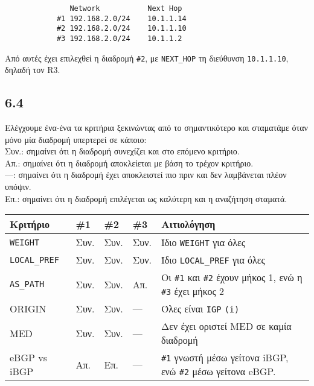 \documentclass[a4paper, 12pt]{article}
\begin{document}
		\begin{verbatim}
			   Network           Next Hop
			#1 192.168.2.0/24    10.1.1.14
			#2 192.168.2.0/24    10.1.1.10
			#3 192.168.2.0/24    10.1.1.2
		\end{verbatim}
		
		Από αυτές έχει επιλεχθεί η διαδρομή \verb|#2|, με \verb|NEXT_HOP| τη διεύθυνση \verb|10.1.1.10|, δηλαδή τον R3.

	\subsection*{6.4}
		Ελέγχουμε ένα-ένα τα κριτήρια ξεκινώντας από το σημαντικότερο και σταματάμε όταν μόνο μία διαδρομή υπερτερεί σε κάποιο: \\
		
		Συν.: σημαίνει ότι η διαδρομή συνεχίζει και στο επόμενο κριτήριο. \\
		Απ.: σημαίνει ότι η διαδρομή αποκλείεται με βάση το τρέχον κριτήριο. \\
		---: σημαίνει ότι η διαδρομή έχει αποκλειστεί πιο πριν και δεν λαμβάνεται πλέον υπόψιν. \\
		Επ.: σημαίνει ότι η διαδρομή επιλέγεται ως καλύτερη και η αναζήτηση σταματά. \\
		
		\begin{tabular}{|l|l|l|l|l|}
			\hline
			\textbf{Κριτήριο} & \textbf{\#1} & \textbf{\#2} & \textbf{\#3} & \textbf{Αιτιολόγηση}                                     \\ 
			\hline
			\verb|WEIGHT|     & Συν.         & Συν.         & Συν.         & Ίδιο \verb|WEIGHT| για όλες                              \\ 
			\hline
			\verb|LOCAL_PREF| & Συν.         & Συν.         & Συν.         & Ίδιο \verb|LOCAL_PREF| για όλες                          \\ 
			\hline
			\verb|AS_PATH|    & Συν.         & Συν.         & Απ.          & Οι \verb|#1| και \verb|#2| έχουν μήκος 1, ενώ η \verb|#3| έχει μήκος 2     \\ 
			\hline
			ORIGIN            & Συν.         & Συν.         & ---          & Όλες είναι \verb|IGP| \verb|(i)|                         \\ 
			\hline
			MED               & Συν.         & Συν.         & ---          & Δεν έχει οριστεί MED σε καμία διαδρομή                   \\ 
			\hline
			eBGP vs iBGP      & Απ.          & Επ.          & ---          & \verb|#1| γνωστή μέσω γείτονα iBGP, ενώ \verb|#2| μέσω γείτονα eBGP. \\ 
			\hline
		\end{tabular} \\
		
\end{document}
